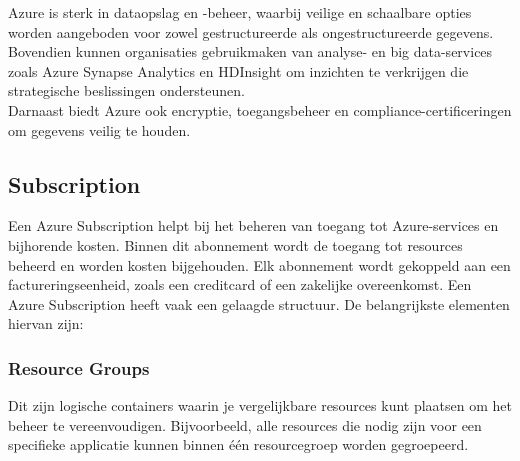 Azure is sterk in dataopslag en -beheer, waarbij veilige en schaalbare opties worden aangeboden voor zowel gestructureerde als ongestructureerde gegevens. Bovendien kunnen organisaties gebruikmaken van analyse- en big data-services zoals Azure Synapse Analytics en HDInsight om inzichten te verkrijgen die strategische beslissingen ondersteunen.~\autocite{Awati2023} \\

Darnaast biedt Azure ook encryptie, toegangsbeheer en compliance-certificeringen om gegevens veilig te houden.~\autocite{Siddiqui2023}

%
%
%

\subsection{Subscription}

Een Azure Subscription helpt bij het beheren van toegang tot Azure-services en bijhorende kosten. Binnen dit abonnement wordt de toegang tot resources beheerd en worden kosten bijgehouden. Elk abonnement wordt gekoppeld aan een factureringseenheid, zoals een creditcard of een zakelijke overeenkomst. Een Azure Subscription heeft vaak een gelaagde structuur. De belangrijkste elementen hiervan zijn:

\subsubsection{Resource Groups}

Dit zijn logische containers waarin je vergelijkbare resources kunt plaatsen om het beheer te vereenvoudigen. Bijvoorbeeld, alle resources die nodig zijn voor een specifieke applicatie kunnen binnen één resourcegroep worden gegroepeerd.~\autocite{Microsoft2024d}

